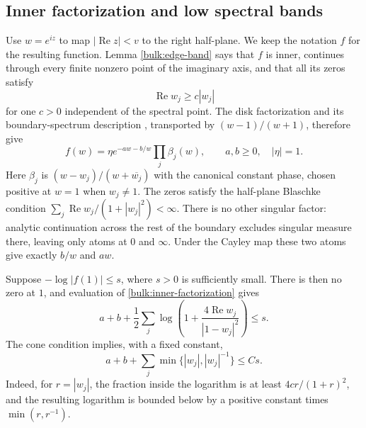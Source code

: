 \subsection{Inner factorization and low spectral bands}

Use $w=e^{iz}$ to map $|\operatorname{Re}z|<v$ to the right
half-plane. We keep the notation $f$ for the resulting function.
Lemma \ref{bulk:edge-band} says that $f$ is inner, continues through
every finite nonzero point of the imaginary axis, and that all its
zeros satisfy
\begin{equation}\label{bulk:zero-cone}
 \operatorname{Re}w_j\ge c|w_j|
\end{equation}
for one $c>0$ independent of the spectral point. The disk
factorization and its boundary-spectrum description
\cite[pp.~1367--1368, Equations (1)--(2)]{AiDongJiang2019}, transported
by $(w-1)/(w+1)$, therefore give
\begin{equation}\label{bulk:inner-factorization}
 f(w)=\eta e^{-aw-b/w}\prod_j\beta_j(w),\qquad
 a,b\ge0,\quad |\eta|=1.
\end{equation}
Here $\beta_j$ is $(w-w_j)/(w+\overline{w_j})$ with the canonical
constant phase, chosen positive at $w=1$ when $w_j\ne1$.
The zeros satisfy the half-plane Blaschke condition
$\sum_j\operatorname{Re}w_j/(1+|w_j|^2)<\infty$.
There is no other singular factor: analytic continuation across
the rest of the boundary excludes singular measure there, leaving
only atoms at $0$ and $\infty$. Under the Cayley map these two
atoms give exactly $b/w$ and $aw$.

Suppose $-\log|f(1)|\le s$, where $s>0$ is sufficiently small.
There is then no zero at $1$, and evaluation of
\eqref{bulk:inner-factorization} gives
\begin{equation}\label{bulk:zero-budget}
 a+b+\frac12\sum_j
 \log\left(1+\frac{4\operatorname{Re}w_j}{|1-w_j|^2}\right)\le s.
\end{equation}
The cone condition implies, with a fixed constant,
\begin{equation}\label{bulk:small-large}
 a+b+\sum_j\min\{|w_j|,|w_j|^{-1}\}\le Cs.
\end{equation}
Indeed, for $r=|w_j|$, the fraction inside the logarithm is at least
$4cr/(1+r)^2$, and the resulting logarithm is bounded below by a
positive constant times $\min(r,r^{-1})$.

